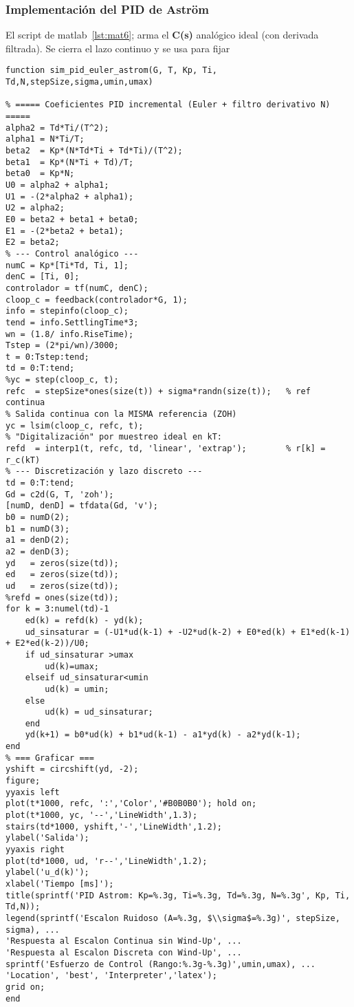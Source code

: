 \subsubsection{Implementación del PID de Astr\"om}
El script de matlab~\ref{lst:mat6}; arma el \textbf{C(s)} analógico ideal (con derivada filtrada). Se cierra el lazo continuo y se usa para fijar 
\onecolumn
\begin{lstlisting}[style=matlabstyle,caption={Script en Matlab},label={lst:mat6}]
function sim_pid_euler_astrom(G, T, Kp, Ti, Td,N,stepSize,sigma,umin,umax)

% ===== Coeficientes PID incremental (Euler + filtro derivativo N) =====
alpha2 = Td*Ti/(T^2);
alpha1 = N*Ti/T;
beta2  = Kp*(N*Td*Ti + Td*Ti)/(T^2);
beta1  = Kp*(N*Ti + Td)/T;
beta0  = Kp*N;
U0 = alpha2 + alpha1;
U1 = -(2*alpha2 + alpha1);
U2 = alpha2;
E0 = beta2 + beta1 + beta0;
E1 = -(2*beta2 + beta1);
E2 = beta2;
% --- Control analógico ---
numC = Kp*[Ti*Td, Ti, 1];
denC = [Ti, 0];
controlador = tf(numC, denC);
cloop_c = feedback(controlador*G, 1);
info = stepinfo(cloop_c);
tend = info.SettlingTime*3;
wn = (1.8/ info.RiseTime);
Tstep = (2*pi/wn)/3000;
t = 0:Tstep:tend;
td = 0:T:tend;
%yc = step(cloop_c, t);
refc  = stepSize*ones(size(t)) + sigma*randn(size(t));   % ref continua
% Salida continua con la MISMA referencia (ZOH)
yc = lsim(cloop_c, refc, t);
% "Digitalización" por muestreo ideal en kT:
refd  = interp1(t, refc, td, 'linear', 'extrap');        % r[k] = r_c(kT)
% --- Discretización y lazo discreto ---
td = 0:T:tend;
Gd = c2d(G, T, 'zoh');
[numD, denD] = tfdata(Gd, 'v');
b0 = numD(2);
b1 = numD(3);
a1 = denD(2);
a2 = denD(3);
yd   = zeros(size(td));
ed   = zeros(size(td));
ud   = zeros(size(td));
%refd = ones(size(td));
for k = 3:numel(td)-1
	ed(k) = refd(k) - yd(k);
	ud_sinsaturar = (-U1*ud(k-1) + -U2*ud(k-2) + E0*ed(k) + E1*ed(k-1) + E2*ed(k-2))/U0;
	if ud_sinsaturar >umax
		ud(k)=umax;
	elseif ud_sinsaturar<umin
		ud(k) = umin;
	else
		ud(k) = ud_sinsaturar;
	end
	yd(k+1) = b0*ud(k) + b1*ud(k-1) - a1*yd(k) - a2*yd(k-1);
end
% === Graficar ===
yshift = circshift(yd, -2);
figure;
yyaxis left
plot(t*1000, refc, ':','Color','#B0B0B0'); hold on;
plot(t*1000, yc, '--','LineWidth',1.3);
stairs(td*1000, yshift,'-','LineWidth',1.2);
ylabel('Salida');
yyaxis right
plot(td*1000, ud, 'r--','LineWidth',1.2);
ylabel('u_d(k)');
xlabel('Tiempo [ms]');
title(sprintf('PID Astrom: Kp=%.3g, Ti=%.3g, Td=%.3g, N=%.3g', Kp, Ti, Td,N));
legend(sprintf('Escalon Ruidoso (A=%.3g, $\\sigma$=%.3g)', stepSize, sigma), ...
'Respuesta al Escalon Continua sin Wind-Up', ...
'Respuesta al Escalon Discreta con Wind-Up', ...
sprintf('Esfuerzo de Control (Rango:%.3g-%.3g)',umin,umax), ...
'Location', 'best', 'Interpreter','latex');
grid on;
end

	
\end{lstlisting}

\twocolumn